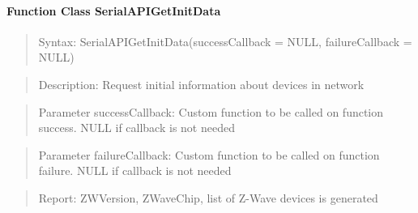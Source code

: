 \paragraph{Function Class SerialAPIGetInitData}
\begin{quote}Syntax: SerialAPIGetInitData(successCallback = NULL, failureCallback = NULL)\end{quote}
\begin{quote}Description: Request initial information about devices in network\end{quote}
\begin{quote}Parameter successCallback: Custom function to be called on function success. NULL if callback is not needed\end{quote}
\begin{quote}Parameter failureCallback: Custom function to be called on function failure. NULL if callback is not needed\end{quote}
\begin{quote}Report: ZWVersion, ZWaveChip, list of Z-Wave devices is generated\end{quote}

